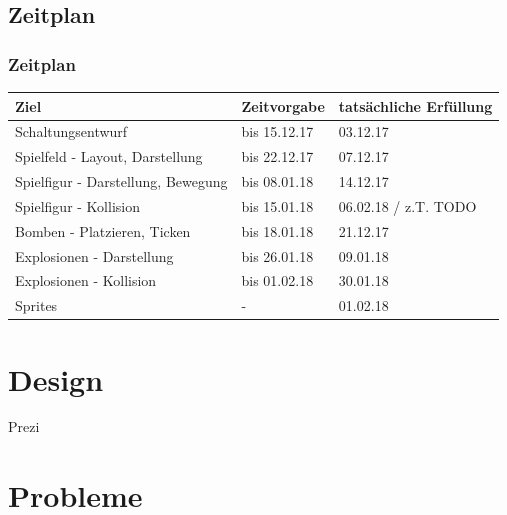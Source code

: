 \documentclass[18pt]{beamer}
\begin{document}
	\subsection{Zeitplan}
		\begin{frame}
			\frametitle{Zeitplan}
			\begin{table}[H]
				\centering
				\label{my-label}
				\begin{tabular}{l|l|l}
					Ziel                                      & Zeitvorgabe  & tatsächliche Erfüllung\\
					\hline
					Schaltungsentwurf                         & bis 15.12.17 & 03.12.17\\
					Spielfeld - Layout, Darstellung           & bis 22.12.17 & 07.12.17\\
					Spielfigur - Darstellung, Bewegung        & bis 08.01.18 & 14.12.17\\
					Spielfigur - Kollision                    & bis 15.01.18 & 06.02.18 / z.T. TODO\\
					Bomben - Platzieren, Ticken               & bis 18.01.18 & 21.12.17\\
					Explosionen - Darstellung                 & bis 26.01.18 & 09.01.18\\
					Explosionen - Kollision                   & bis 01.02.18 & 30.01.18\\
					Sprites                                   & - & 01.02.18\\
				\end{tabular}
			\end{table}
		\end{frame}
	
\section{Design}
	\begin{frame}
		\centering \huge Prezi
	\end{frame}
	
\section{Probleme}
\end{document}
